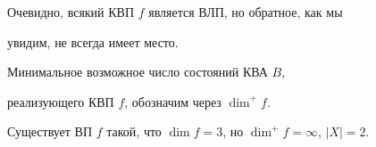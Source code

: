 Очевидно, всякий КВП $f$ является ВЛП, но обратное, как мы


увидим, не всегда имеет место.





Минимальное возможное число состояний КВА $B$, 


реализующего КВП $f$, обозначим через $\dim^+f$.





\begin{thm}


Существует ВП $f$ такой, что $\dim f=3$, но $\dim^+f=\infty$, $|X|=2$.


\end{thm}





